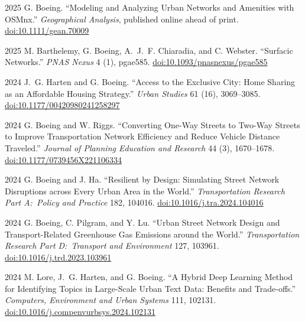 \documentclass[11pt,letterpaper]{report} %
\begin{document}
\begin{tablist}
        \item[2025] \tab{}G. Boeing. \enquote{Modeling and Analyzing Urban Networks and Amenities with OSMnx.} \textit{Geographical Analysis}, published online ahead of print. \href{https://doi.org/10.1111/gean.70009}{doi:10.1111/gean.70009}

        \item[2025] \tab{}M. Barthelemy, G. Boeing, A.~J.~F. Chiaradia, and C. Webster. \enquote{Surfacic Networks.} \textit{PNAS Nexus} 4 (1), pgae585. \href{https://doi.org/10.1093/pnasnexus/pgae585}{doi:10.1093/pnasnexus/pgae585}

        \item[2024] \tab{}J.~G. Harten and G. Boeing. \enquote{Access to the Exclusive City: Home Sharing as an Affordable Housing Strategy.} \textit{Urban Studies} 61 (16), 3069--3085. \href{https://doi.org/10.1177/00420980241258297}{doi:10.1177/00420980241258297}

        \item[2024] \tab{}G. Boeing and W. Riggs. \enquote{Converting One-Way Streets to Two-Way Streets to Improve Transportation Network Efficiency and Reduce Vehicle Distance Traveled.} \textit{Journal of Planning Education and Research} 44 (3), 1670--1678. \href{https://doi.org/10.1177/0739456X221106334}{doi:10.1177/0739456X221106334}

        \item[2024] \tab{}G. Boeing and J. Ha. \enquote{Resilient by Design: Simulating Street Network Disruptions across Every Urban Area in the World.} \textit{Transportation Research Part A:\ Policy and Practice} 182, 104016. \href{https://doi.org/10.1016/j.tra.2024.104016}{doi:10.1016/j.tra.2024.104016}

        \item[2024] \tab{}G. Boeing, C. Pilgram, and Y. Lu. \enquote{Urban Street Network Design and Transport-Related Greenhouse Gas Emissions around the World.} \textit{Transportation Research Part D:\ Transport and Environment} 127, 103961. \href{https://doi.org/10.1016/j.trd.2023.103961}{doi:10.1016/j.trd.2023.103961}

        \item[2024] \tab{}M. Lore, J.~G. Harten, and G. Boeing. \enquote{A Hybrid Deep Learning Method for Identifying Topics in Large-Scale Urban Text Data: Benefits and Trade-offs.} \textit{Computers, Environment and Urban Systems} 111, 102131. \href{https://doi.org/10.1016/j.compenvurbsys.2024.102131}{doi:10.1016/j.compenvurbsys.2024.102131}


\end{tablist}
\end{document}
